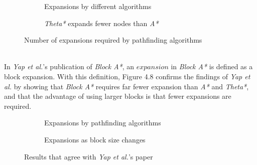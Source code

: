 \documentclass[12pt,notitlepage]{report}
\begin{document}
\begin{figure}
\centering
  \begin{subfigure}[b]{0.49\textwidth}
  \centering
  
  \caption{Expansions by different algorithms}
  \end{subfigure}
  \begin{subfigure}[b]{0.49\textwidth}
  \centering
  \caption{{\em Theta*} expands fewer nodes than {\em A*}}
  \end{subfigure}
\caption{Number of expansions required by pathfinding algorithms}
\end{figure}

\\
\noindent
In {\em Yap et al.}'s publication of {\em Block A*}, an $expansion$ in {\em Block A*} is defined as a block expansion. With this definition,  Figure 4.8 confirms the findings of {\em Yap et al.} by showing that {\em Block A*} requires far fewer expansion than {\em A*} and {\em Theta*}, and that the advantage of using larger blocks is that fewer expansions are required.\\

\begin{figure}
\centering
  \begin{subfigure}{0.49\textwidth}
  \centering
  
  \caption{Expansions by pathfinding algorithms}
  \end{subfigure}
  \begin{subfigure}{0.49\textwidth}
  \centering
  
  \caption{Expansions as block size changes}
  \end{subfigure}
\caption{Results that agree with {\em Yap et al.}'s paper}
\end{figure}
\end{document}
